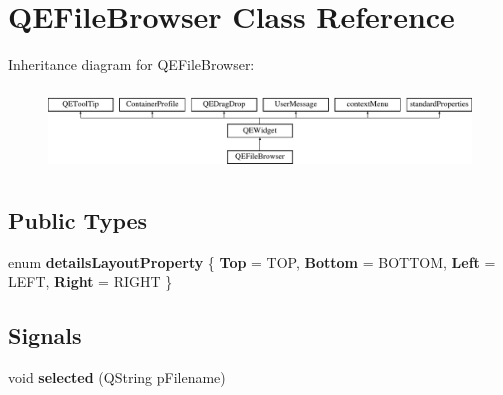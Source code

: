 \hypertarget{classQEFileBrowser}{
\section{QEFileBrowser Class Reference}
\label{classQEFileBrowser}
}
Inheritance diagram for QEFileBrowser:\begin{figure}[H]
\begin{center}
\leavevmode
\includegraphics[height=2.204725cm]{classQEFileBrowser}
\end{center}
\end{figure}
\subsection*{Public Types}
\begin{DoxyCompactItemize}
\item 
enum {\bfseries detailsLayoutProperty} \{ {\bfseries Top} =  TOP, 
{\bfseries Bottom} =  BOTTOM, 
{\bfseries Left} =  LEFT, 
{\bfseries Right} =  RIGHT
 \}
\end{DoxyCompactItemize}
\subsection*{Signals}
\begin{DoxyCompactItemize}
\item 
\hypertarget{classQEFileBrowser_a97ffe67253c32a83eab315eda09174a7}{
void {\bfseries selected} (QString pFilename)}
\label{classQEFileBrowser_a97ffe67253c32a83eab315eda09174a7}

\end{DoxyCompactItemize}
